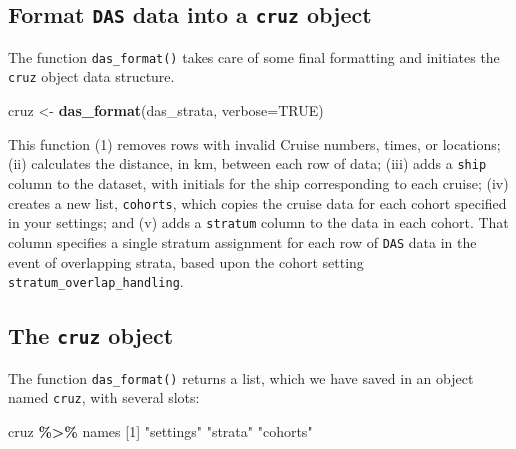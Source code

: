 \documentclass[
]{book}
\newenvironment{Shaded}{\begin{snugshade}}{\end{snugshade}}
\newcommand{\AttributeTok}[1]{\textcolor[rgb]{0.13,0.29,0.53}{#1}}
\newcommand{\ConstantTok}[1]{\textcolor[rgb]{0.56,0.35,0.01}{#1}}
\newcommand{\DecValTok}[1]{\textcolor[rgb]{0.00,0.00,0.81}{#1}}
\newcommand{\FunctionTok}[1]{\textcolor[rgb]{0.13,0.29,0.53}{\textbf{#1}}}
\newcommand{\NormalTok}[1]{#1}
\newcommand{\OtherTok}[1]{\textcolor[rgb]{0.56,0.35,0.01}{#1}}
\newcommand{\SpecialCharTok}[1]{\textcolor[rgb]{0.81,0.36,0.00}{\textbf{#1}}}
\newcommand{\StringTok}[1]{\textcolor[rgb]{0.31,0.60,0.02}{#1}}
\begin{document}
\hypertarget{format-das-data-into-a-cruz-object}{%
\subsection*{\texorpdfstring{Format \texttt{DAS} data into a \texttt{cruz} object}{Format DAS data into a cruz object}}\label{format-das-data-into-a-cruz-object}}

The function \texttt{das\_format()} takes care of some final formatting and initiates the \texttt{cruz} object data structure.

\begin{Shaded}
\begin{Highlighting}[]
\NormalTok{cruz }\OtherTok{\textless{}{-}} \FunctionTok{das\_format}\NormalTok{(das\_strata, }\AttributeTok{verbose=}\ConstantTok{TRUE}\NormalTok{)}
\end{Highlighting}
\end{Shaded}

This function (1) removes rows with invalid Cruise numbers, times, or locations; (ii) calculates the distance, in km, between each row of data; (iii) adds a \texttt{ship} column to the dataset, with initials for the ship corresponding to each cruise; (iv) creates a new list, \texttt{cohorts}, which copies the cruise data for each cohort specified in your settings; and (v) adds a \texttt{stratum} column to the data in each cohort. That column specifies
a single stratum assignment for each row of \texttt{DAS} data in the event of overlapping strata, based upon the cohort setting \texttt{stratum\_overlap\_handling}.

\hypertarget{the-cruz-object}{%
\subsection*{\texorpdfstring{The \texttt{cruz} object}{The cruz object}}\label{the-cruz-object}}

The function \texttt{das\_format()} returns a list, which we have saved in an object named \texttt{cruz}, with several slots:

\begin{Shaded}
\begin{Highlighting}[]
\NormalTok{cruz }\SpecialCharTok{\%\textgreater{}\%}\NormalTok{ names}
\NormalTok{[}\DecValTok{1}\NormalTok{] }\StringTok{"settings"} \StringTok{"strata"}   \StringTok{"cohorts"} 
\end{Highlighting}
\end{Shaded}
\end{document}
